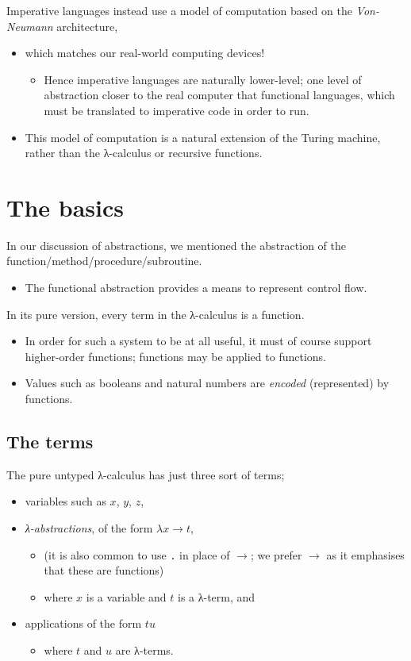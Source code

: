 \documentclass[11pt]{article}
\theoremstyle{definition}
\begin{document}
Imperative languages instead use a model of computation
based on the \emph{Von-Neumann} architecture,
\begin{itemize}
\item which matches our real-world computing devices!
\begin{itemize}
\item Hence imperative languages are naturally lower-level;
one level of abstraction closer to the real computer
that functional languages, which must be translated
to imperative code in order to run.
\end{itemize}
\item This model of computation is a natural extension
of the Turing machine, rather than the λ-calculus
or recursive functions.
\end{itemize}

\section{The basics}
\label{sec:orgb1bbe82}

In our discussion of abstractions, we mentioned
the abstraction of the function/method/procedure/subroutine.
\begin{itemize}
\item The functional abstraction provides a means
to represent control flow.
\end{itemize}

In its pure version, every term in the λ-calculus
is a function.
\begin{itemize}
\item In order for such a system to be at all useful,
it must of course support higher-order functions;
functions may be applied to functions.
\item Values such as booleans and natural numbers
are \emph{encoded} (represented) by functions.
\end{itemize}

\subsection{The terms}
\label{sec:orga56f8a8}

The pure untyped λ-calculus has just three sort of terms;
\begin{itemize}
\item variables such as \(x\), \(y\), \(z\),
\item \emph{λ-abstractions}, of the form \(λ x → t\),
\begin{itemize}
\item (it is also common to use \(․\) in place of \(→\);
we prefer \(→\) as it emphasises that these are functions)
\item where \(x\) is a variable and \(t\) is a λ-term, and
\end{itemize}
\item applications of the form \(t u\)
\begin{itemize}
\item where \(t\) and \(u\) are λ-terms.
\end{itemize}
\end{itemize}
\end{document}
